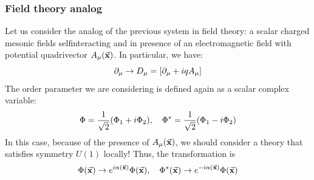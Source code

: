 \documentclass[../main/main.tex]{subfiles}
\begin{document}
\subsubsection{Field theory analog}
Let us consider the analog of the previous system in field theory: a scalar charged mesonic fields selfinteracting and in presence of an electromagnetic field with potential quadrivector \( A_ \mu  ( \va{x}) \). In particular, we have:
\begin{equation*}
  \partial_ \mu  \rightarrow  D _ \mu = \qty[ \partial_ \mu  + i q A _ \mu  ]
\end{equation*}
The order parameter we are considering is defined again as a scalar complex variable:
\begin{equation*}
  \Phi = \frac{1}{\sqrt{2} } \qty(\Phi _1 + i \Phi _2), \quad \Phi ^* = \frac{1}{\sqrt{2} } \qty(\Phi _1 - i \Phi _2)
\end{equation*}
In this case, because of the presence of \( A _ \mu (\va{x}) \), we should consider a theory that satisfies symmetry \( U(1) \) locally! Thus, the transformation is
\begin{equation}
  \Phi  ( \va{x} ) \rightarrow e^{i \alpha (\va{x})} \Phi (\va{x}), \quad \Phi^*  ( \va{x} ) \rightarrow e^{-i \alpha (\va{x})} \Phi (\va{x})
\end{equation}
\end{document}
